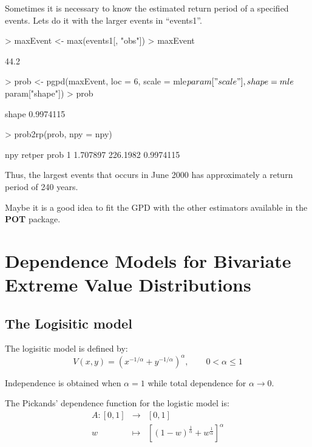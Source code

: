 \documentclass[a4paper]{article}
\numberwithin{equation}{section}
\theoremstyle{definition}
\begin{document}
Sometimes it is necessary to know the estimated return period of a
specified events. Lets do it with the larger events in ``events1''.
\begin{Schunk}
\begin{Sinput}
> maxEvent <- max(events1[, "obs"])
> maxEvent
\end{Sinput}
\begin{Soutput}
[1] 44.2
\end{Soutput}
\begin{Sinput}
> prob <- pgpd(maxEvent, loc = 6, scale = mle$param["scale"], shape = mle$param["shape"])
> prob
\end{Sinput}
\begin{Soutput}
    shape 
0.9974115 
\end{Soutput}
\begin{Sinput}
> prob2rp(prob, npy = npy)
\end{Sinput}
\begin{Soutput}
       npy   retper      prob
1 1.707897 226.1982 0.9974115
\end{Soutput}
\end{Schunk}

Thus, the largest events that occurs in June 2000 has approximately a
return period of 240 years.

Maybe it is a good idea to fit the GPD with the other estimators
available in the \textbf{POT} package.

\clearpage
\appendix

\section{Dependence Models for Bivariate Extreme Value
  Distributions}
\label{sec:copula}

\subsection{The Logisitic model}

The logisitic model is defined by:
\begin{equation}
  \label{eq:logistic}
  V(x,y) = \left( x^{-1/\alpha} + y^{-1/\alpha} \right)^\alpha, \qquad
  0 < \alpha \leq 1 
\end{equation}

Independence is obtained when $\alpha = 1$ while total dependence for
$\alpha \rightarrow 0$.

The Pickands' dependence function for the logistic model is:
\begin{eqnarray*}
  A: \left[0,1\right] &\longrightarrow& \left[0,1\right]\\
  w &\longmapsto& \left[\left(1-w\right)^\frac{1}{\alpha} +
    w^\frac{1}{\alpha} \right]^\alpha
\end{eqnarray*}
\end{document}
